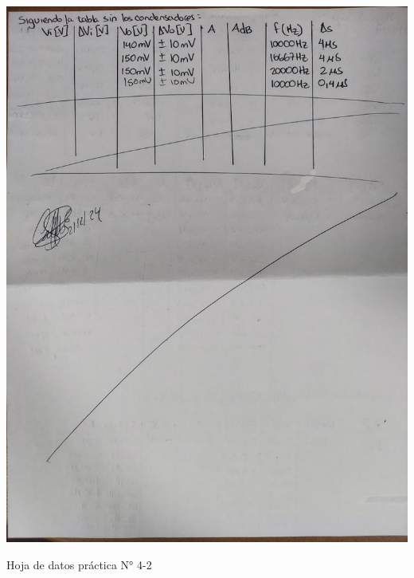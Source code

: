 \begin{ilustracion}[ht]
    \centering
    \includegraphics[width=1.0\textwidth]{src/images/p4/p4-hoja-de-datos-2.jpg}
    \caption{Hoja de datos práctica N° 4-2}
    \label{ilus:hoja-de-datos-p4-2}
\end{ilustracion}

